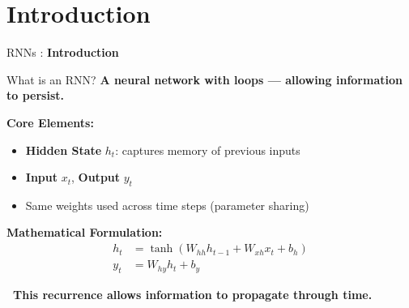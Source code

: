 \section{Introduction}
\begin{frame}{}
    \LARGE RNNs : \textbf{Introduction}
\end{frame}

\begin{frame}{What is an RNN?}
    \textbf{A neural network with loops — allowing information to persist.}

    \vspace{0.5em}
    \textbf{Core Elements:}
    \begin{itemize}
        \item \textbf{Hidden State} $h_t$: captures memory of previous inputs
        \item \textbf{Input} $x_t$, \textbf{Output} $y_t$
        \item Same weights used across time steps (parameter sharing)
    \end{itemize}

    \vspace{0.5em}
    \textbf{Mathematical Formulation:}
    \begin{align*}
        h_t &= \tanh(W_{hh} h_{t-1} + W_{xh} x_t + b_h) \\
        y_t &= W_{hy} h_t + b_y
    \end{align*}

    \vspace{0.5em}
    \textbf{\faThumbTack\ This recurrence allows information to propagate through time.}
\end{frame}


